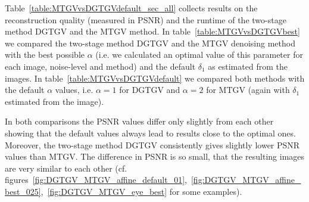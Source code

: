 \documentclass[twocolumn,envcountsame]{svjour3}
\begin{document}
Table~\ref{table:MTGVvsDGTGVdefault_sec_all} collects results on the reconstruction quality (measured in PSNR) and the runtime of the two-stage method DGTGV and the MTGV method.
In table~\ref{table:MTGVvsDGTGVbest} we compared the two-stage method DGTGV and the MTGV denoising method with the best possible $\alpha$ (i.e. we calculated an optimal value of this parameter for each image, noise-level and method) and the default $\delta_{1}$ as estimated from the images.
In table~\ref{table:MTGVvsDGTGVdefault} we compared both methods with the default $\alpha$ values, i.e. $\alpha = 1$ for DGTGV and $\alpha = 2$ for MTGV (again with $\delta_{1}$ estimated from the image). 

In both comparisons the PSNR values differ only slightly from each other showing that the default values always lead to results close to the optimal ones.
Moreover, the two-stage method DGTGV consistently gives slightly lower PSNR values than MTGV.
The difference in PSNR is so small, that the resulting images are very similar to each other (cf. figures~\ref{fig:DGTGV_MTGV_affine_default_01},~\ref{fig:DGTGV_MTGV_affine_best_025},~\ref{fig:DGTGV_MTGV_eye_best} for some examples). 
\end{document}
